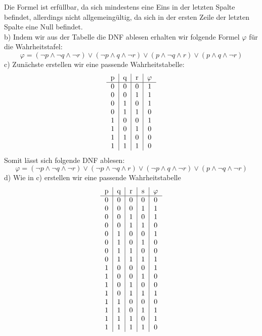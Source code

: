 \documentclass{article}
\begin{document}
\bigskip
Die Formel ist erfüllbar, da sich mindestens eine Eins in der letzten Spalte
befindet, allerdings nicht allgemeingültig, da sich in der ersten Zeile der letzten 
Spalte eine Null befindet. 
\bigskip \\ 
b)  Indem wir aus der Tabelle die DNF ablesen erhalten wir folgende
    Formel $\varphi$ für die Wahrheitstafel:
    \[
        \varphi = (\neg p \wedge \neg q \wedge \neg r) \vee
        (\neg p \wedge q \wedge \neg r) \vee
        (p \wedge \neg q \wedge r) \vee
        (p \wedge q \wedge \neg r) 
    \]  
\bigskip 
c)  Zunächste erstellen wir eine passende Wahrheitstabelle: 
\[
\begin{tabular}[h]{c|c|c|c}
    p & q & r & $\varphi$ \\ \hline
    0 & 0 & 0 & 1 \\ 
    0 & 0 & 1 & 1 \\
    0 & 1 & 0 & 1 \\ 
    0 & 1 & 1 & 0 \\ 
    1 & 0 & 0 & 1 \\ 
    1 & 0 & 1 & 0 \\ 
    1 & 1 & 0 & 0 \\ 
    1 & 1 & 1 & 0 \\
\end{tabular}
\]
Somit lässt sich folgende DNF ablesen:
\[
    \varphi = (\neg p \wedge \neg q \wedge \neg r) \vee
    (\neg p \wedge \neg q \wedge r) \vee
    (\neg p \wedge q \wedge \neg r) \vee
    (p \wedge \neg q \wedge \neg r)
\]
\bigskip
d) Wie in c) erstellen wir eine passende Wahrheitstabelle
\[
    \begin{tabular}[h]{c|c|c|c|c}
        p & q & r & s & $\varphi$ \\ \hline
        0 & 0 & 0 & 0 & 0 \\  
        0 & 0 & 0 & 1 & 1 \\
        0 & 0 & 1 & 0 & 1 \\ 
        0 & 0 & 1 & 1 & 0 \\ 
        0 & 1 & 0 & 0 & 1 \\ 
        0 & 1 & 0 & 1 & 0 \\ 
        0 & 1 & 1 & 0 & 0 \\ 
        0 & 1 & 1 & 1 & 1 \\ 
        1 & 0 & 0 & 0 & 1 \\
        1 & 0 & 0 & 1 & 0 \\
        1 & 0 & 1 & 0 & 0 \\ 
        1 & 0 & 1 & 1 & 1 \\ 
        1 & 1 & 0 & 0 & 0 \\ 
        1 & 1 & 0 & 1 & 1 \\ 
        1 & 1 & 1 & 0 & 1 \\ 
        1 & 1 & 1 & 1 & 0 \\ 
    \end{tabular}
\]
\end{document}
